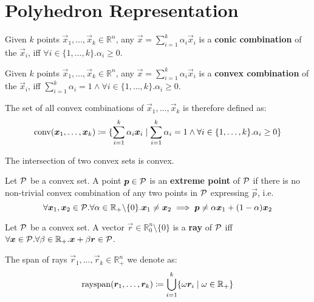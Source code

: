 \section{Polyhedron Representation}\label{sec:preliminaries_poly}

\begin{definition}
Given $k$ points $\vec{x}_1, \dots, \vec{x}_k \in \mathbb{R}^n$, any $\vec{x} = \sum_{i=1}^{k} \alpha_i \vec{x}_i$ is a \textbf{conic combination} of the $\vec{x}_i$, iff $\forall i \in \{1, \dots, k\}. \alpha_i \geq 0$.
\end{definition}

\begin{definition}\label{def:convex}
Given $k$ points $\vec{x}_1, \dots, \vec{x}_k \in \mathbb{R}^n$, any $\vec{x} = \sum_{i=1}^{k} \alpha_i \vec{x}_i$ is a \textbf{convex combination} of the $\vec{x}_i$, iff $\sum_{i=1}^{k} \alpha_i = 1 \land \forall i \in \{1, \dots, k\}. \alpha_i \geq 0$.

The set of all convex combinations of $\vec{x}_1, \dots, \vec{x}_k$ is therefore defined as:
\begin{equation*}
\operatorname{conv}({\bm{x}}_1, \dots, {\bm{x}}_k) \coloneqq \{\sum_{i=1}^{k} \alpha_i {\bm{x}}_i \mid \sum_{i=1}^{k} \alpha_i = 1 \land \forall i \in \{1, \dots, k\}. \alpha_i \geq 0\}
\end{equation*}
\end{definition}

\begin{corollary}\label{cor:intersection_convex}
The intersection of two convex sets is convex.
\end{corollary}

\begin{definition}
Let $\mathcal{P}$ be a convex set. A point ${\bm{p}} \in \mathcal{P}$ is an \textbf{extreme point} of $\mathcal{P}$ if there is no non-trivial convex combination of any two points in $\mathcal{P}$ expressing $\vec{p}$, i.e.
\begin{equation*}
\forall {\bm{x}}_1, {\bm{x}}_2 \in \mathcal{P}. \forall \alpha \in \mathbb{R}_+ \backslash \{0\}. {\bm{x}}_1 \neq {\bm{x}}_2 \implies {\bm{p}} \neq \alpha {\bm{x}}_1 + (1 - \alpha) {\bm{x}}_2
\end{equation*}
\end{definition}

\begin{definition}\label{def:rays}
Let $\mathcal{P}$ be a convex set. A vector $\vec{r} \in \mathbb{R}_0^n \setminus \{0\}$ is a \textbf{ray} of $\mathcal{P}$ iff $\forall {\bm{x}} \in \mathcal{P}. \forall \beta \in \mathbb{R}_+. {\bm{x}} + \beta {\bm{r}} \in \mathcal{P}$.

The span of rays $\vec{r}_1, \dots, \vec{r}_k \in \mathbb{R}_+^n$ we denote as:
\begin{equation*}
\operatorname{rayspan}({\bm{r}}_1, \dots, {\bm{r}}_k) \coloneqq \bigcup_{i=1}^{k} \{\omega {\bm{r}}_i \mid \omega \in \mathbb{R}_+\}
\end{equation*}
\end{definition}

